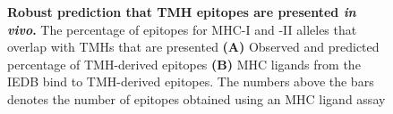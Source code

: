 \begin{figure}[!htbp]
  \caption{
    \textbf{
      Robust prediction that TMH epitopes are presented \emph{in vivo}.
    }
    The percentage of epitopes for MHC-I and -II alleles 
    that overlap with TMHs that are presented
    \textbf{(A)} 
    Observed and predicted percentage of TMH-derived epitopes
    \textbf{(B)} 
    MHC ligands from the IEDB bind to TMH-derived epitopes.
    The numbers above the bars denotes the number of epitopes
    obtained using an MHC ligand assay
  }
  \label{fig:elution}
\end{figure}

\clearpage

\thispagestyle{empty}

%
%
\begin{figure}[!htbp]
  \centering


\end{figure}
